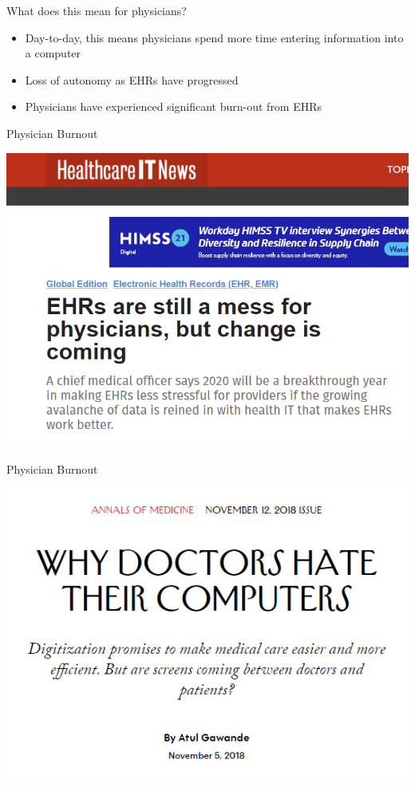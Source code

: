 \documentclass[10pt]{beamer}
\begin{document}
\begin{frame}[fragile]{What does this mean for physicians?}
\begin{itemize}
    \item Day-to-day, this means physicians spend more time entering information into a computer 
    \item Loss of autonomy as EHRs have progressed
    \item Physicians have experienced significant burn-out from EHRs
\end{itemize}

\end{frame}

\begin{frame}[noframenumbering]{Physician Burnout}
\begin{center}
    \includegraphics[scale=.4]{graphics/News Clip1.PNG}
\end{center}
\end{frame}

\begin{frame}[noframenumbering]{Physician Burnout}
\begin{center}
    \includegraphics[scale=.5]{graphics/News Clip2.PNG}
\end{center}
\end{frame}
\end{document}
